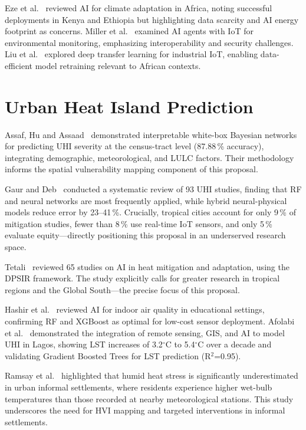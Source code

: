 Eze et al.~\cite{eze2025} reviewed AI for climate adaptation in Africa, noting successful deployments in Kenya and Ethiopia but highlighting data scarcity and AI energy footprint as concerns. Miller et al.~\cite{miller2025} examined AI agents with IoT for environmental monitoring, emphasizing interoperability and security challenges. Liu et al.~\cite{liu2021} explored deep transfer learning for industrial IoT, enabling data-efficient model retraining relevant to African contexts.

\section{Urban Heat Island Prediction}
Assaf, Hu and Assaad~\cite{assaf2023} demonstrated interpretable white-box Bayesian networks for predicting UHI severity at the census-tract level (87.88\,\% accuracy), integrating demographic, meteorological, and LULC factors. Their methodology informs the spatial vulnerability mapping component of this proposal.

Gaur and Deb~\cite{gaur2026} conducted a systematic review of 93 UHI studies, finding that RF and neural networks are most frequently applied, while hybrid neural-physical models reduce error by 23--41\,\%. Crucially, tropical cities account for only 9\,\% of mitigation studies, fewer than 8\,\% use real-time IoT sensors, and only 5\,\% evaluate equity—directly positioning this proposal in an underserved research space.

Tetali~\cite{tetali2025} reviewed 65 studies on AI in heat mitigation and adaptation, using the DPSIR framework. The study explicitly calls for greater research in tropical regions and the Global South—the precise focus of this proposal.

Hashir et al.~\cite{hashir2026} reviewed AI for indoor air quality in educational settings, confirming RF and XGBoost as optimal for low-cost sensor deployment. Afolabi et al.~\cite{OS_Afolabi_2025,Olalekan_Afolabi_2025} demonstrated the integration of remote sensing, GIS, and AI to model UHI in Lagos, showing LST increases of 3.2$^\circ$C to 5.4$^\circ$C over a decade and validating Gradient Boosted Trees for LST prediction (R$^2$=0.95).

Ramsay et al.~\cite{ramsay2024} highlighted that humid heat stress is significantly underestimated in urban informal settlements, where residents experience higher wet-bulb temperatures than those recorded at nearby meteorological stations. This study underscores the need for HVI mapping and targeted interventions in informal settlements.

